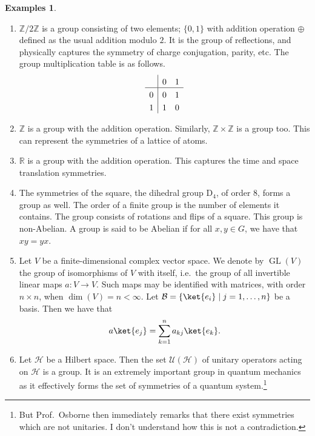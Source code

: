 \documentclass[a4 paper, 12pt, oneside]{book}
\theoremstyle{definition}
\newtheorem{examples}[theorem]{Examples}
\newcommand{\rr}{\mathbb{R}}
\newcommand{\zz}{\mathbb{Z}}
\DeclareMathOperator{\GL}{GL}
\newcommand{\basis}{\mathcal{B}}
\newcommand{\hilbert}{\mathcal{H}}
\newcommand{\unitary}{\mathcal{U}}
\begin{document}
	\begin{examples}
		\leavevmode \vspace{-\baselineskip}\vspace{12pt}
		\begin{enumerate}[label={(\alph*)},ref={\alph*}]
			\item \(\zz / 2\zz\) is a group consisting of two elements; \(\{0, 1\}\) with addition operation \(\oplus\) defined as the usual addition modulo \(2\). It is the group of reflections, and physically captures the symmetry of charge conjugation, parity, etc.
			The group multiplication table is as follows.
			\begin{align*}
				\setlength{\extrarowheight}{3pt}%
				\begin{array}{l|*{5}{l}}
					& 0   & 1\\
					\hline
					0   & 0   & 1\\
					1   & 1   & 0\\
				\end{array}
			\end{align*}
			\item \(\zz\) is a group with the addition operation. Similarly, \(\zz \times \zz\) is a group too. This can represent the symmetries of a lattice of atoms.
			\item \(\rr\) is a group with the addition operation. This captures the time and space translation symmetries.
			\item The symmetries of the square, the dihedral group \(\mathrm{D}_4\), of order \(8\), forms a group as well. The order of a finite group is the number of elements it contains. The group consists of rotations and flips of a square. This group is non-Abelian. A group is said to be Abelian if for all \(x, y \in G\), we have that \(xy = yx\).
			\item Let \(V\) be a finite-dimensional complex vector space. We denote by \(\GL(V)\) the group of isomorphisms of \(V\) with itself, i.e.\ the group of all invertible linear maps \(a \colon V \rightarrow V\). Such maps may be identified with matrices, with order \(n \times n\), when \(\dim (V) = n < \infty\). Let \(\basis = \{\ket{e_i} \mid j = 1, \ldots, n\}\) be a basis. Then we have that
			\begin{align*}
				a\ket{e_j} = \sum_{k=1}^n a_{kj}\ket{e_k}.
			\end{align*}
			\item Let \(\hilbert\) be a Hilbert space. Then the set \(\unitary(\hilbert)\) of unitary operators acting on \(\hilbert\) is a group. It is an extremely important group in quantum mechanics as it effectively forms the set of symmetries of a quantum system.\footnote{But Prof.\ Osborne then immediately remarks that there exist symmetries which are not unitaries. I don't understand how this is not a contradiction.}
		\end{enumerate}
	\end{examples}
\end{document}
